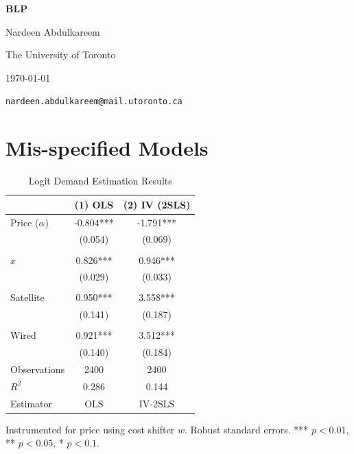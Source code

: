 \documentclass[12pt]{article}
\begin{document}
\begin{titlepage}
    \thispagestyle{empty} %
    \centering
    \vspace*{\fill}

    {\Large \textbf{BLP} \par}

    \vspace{3em}
    {\large Nardeen Abdulkareem \par}
    {\normalsize The University of Toronto \par}
    {\normalsize \today \par}
    {\texttt{nardeen.abdulkareem@mail.utoronto.ca} \par}

    \vspace*{\fill}
\end{titlepage}
\clearpage

\section{Mis-specified Models}
\begin{table}[!htbp]\centering
\caption{Logit Demand Estimation Results}
\label{tab:demand_results}
\begin{threeparttable}
\footnotesize
\begin{tabular}{lcc}
\toprule
 & (1) OLS & (2) IV (2SLS) \\
\midrule
Price ($\alpha$) 
    & -0.804*** 
    & -1.791*** \\
    & (0.054) 
    & (0.069) \\
\\
$x$ 
    & 0.826*** 
    & 0.946*** \\
    & (0.029) 
    & (0.033) \\
\\
Satellite
    & 0.950*** 
    & 3.558*** \\
    & (0.141) 
    & (0.187) \\
\\
Wired
    & 0.921*** 
    & 3.512*** \\
    & (0.140) 
    & (0.184) \\
\midrule
Observations & 2400 & 2400 \\
$R^2$ & 0.286 & 0.144 \\
Estimator & OLS & IV-2SLS \\
\bottomrule
\end{tabular}
\begin{tablenotes}
\item Instrumented for price using cost shifter $w$. Robust standard errors. *** $p<0.01$, ** $p<0.05$, * $p<0.1$.
\end{tablenotes}

\end{threeparttable}
\end{table}
\end{document}
